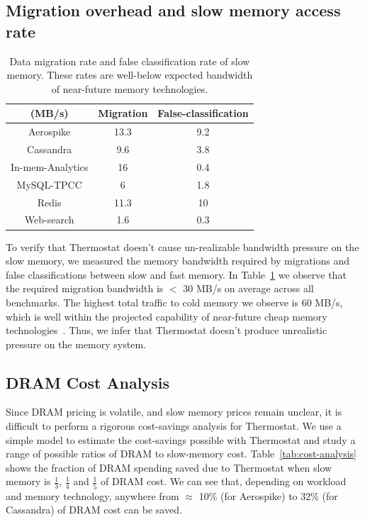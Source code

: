\subsection{Migration overhead and slow memory access rate}
\begin{table}
\begin{center}
\begin{tabular}{|c|c|c|}
\hline
(MB/s)&Migration& False-classification\\
\hline
Aerospike & 13.3& 9.2\\
\hline
Cassandra & 9.6 & 3.8\\
\hline
In-mem-Analytics & 16& 0.4\\
\hline
MySQL-TPCC & 6 & 1.8\\
\hline
Redis & 11.3& 10\\
\hline
Web-search & 1.6 & 0.3\\
\hline
\end{tabular}
\caption{Data migration rate and false classification rate of slow memory. These rates are
well-below expected bandwidth of near-future memory technologies.}
\label{tab:nvm-access-rate}
\end{center}
\vspace{-0.15in}
\end{table}

To verify that Thermostat doesn't cause un-realizable bandwidth pressure on the
slow memory, we measured the memory bandwidth required by migrations and false
classifications between slow and fast memory.  In
Table~\ref{tab:nvm-access-rate} we observe that the required migration bandwidth
is $<$ 30 MB/s on average across all benchmarks.  The highest total traffic to
cold memory we observe is 60 MB/s, which is well within the projected capability
of near-future cheap memory technologies~\cite{ref:Dulloor:datatiering}. Thus,
we infer that Thermostat doesn't produce unrealistic pressure on the memory
system.

\subsection{DRAM Cost Analysis}
\label{dram-cost}
Since DRAM pricing is volatile, and slow memory prices remain unclear, it is difficult
to perform a rigorous cost-savings analysis for Thermostat.  We use a simple
model to estimate the cost-savings possible with Thermostat and study a range of 
possible ratios of DRAM to slow-memory cost.
Table~\ref{tab:cost-analysis} shows the fraction of DRAM spending
saved due to Thermostat when slow memory is $\frac{1}{3}$, $\frac{1}{4}$ and
$\frac{1}{5}$ of DRAM cost. We can see that, depending on workload and memory
technology, anywhere from $\approx$ 10\% (for Aerospike) to 32\% (for Cassandra)
of DRAM cost can be saved.

